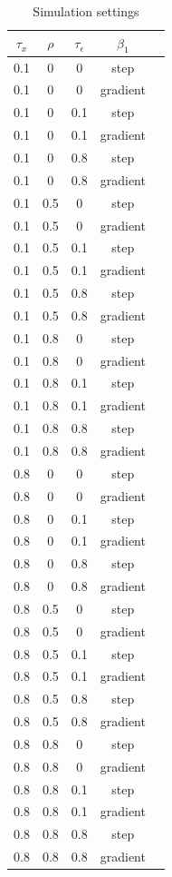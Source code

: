 \documentclass[authoryear, review, 11pt]{elsarticle}
\begin{document}
		\begin{table}[ht]
			\caption{Simulation settings} %
			\vspace{1mm}
			\centering  %
			\begin{tabular}{c c c c c} %
			\hline\hline                        %
			$\tau_x$ & $\rho$ & $\tau_\epsilon$ & $\beta_1$ \\ %
			\hline                  %
			0.1 & 0 & 0 & step \\
			0.1 & 0 & 0 & gradient \\
			0.1 & 0 & 0.1 & step \\
			0.1 & 0 & 0.1 & gradient \\
			0.1 & 0 & 0.8 & step \\
			0.1 & 0 & 0.8 & gradient \\
			0.1 & 0.5 & 0 & step \\
			0.1 & 0.5 & 0 & gradient \\
			0.1 & 0.5 & 0.1 & step \\
			0.1 & 0.5 & 0.1 & gradient \\
			0.1 & 0.5 & 0.8 & step \\
			0.1 & 0.5 & 0.8 & gradient \\
			0.1 & 0.8 & 0 & step \\
			0.1 & 0.8 & 0 & gradient \\
			0.1 & 0.8 & 0.1 & step \\
			0.1 & 0.8 & 0.1 & gradient \\
			0.1 & 0.8 & 0.8 & step \\
			0.1 & 0.8 & 0.8 & gradient \\				
			0.8 & 0 & 0 & step \\
			0.8 & 0 & 0 & gradient \\
			0.8 & 0 & 0.1 & step \\
			0.8 & 0 & 0.1 & gradient \\
			0.8 & 0 & 0.8 & step \\
			0.8 & 0 & 0.8 & gradient \\
			0.8 & 0.5 & 0 & step \\
			0.8 & 0.5 & 0 & gradient \\
			0.8 & 0.5 & 0.1 & step \\
			0.8 & 0.5 & 0.1 & gradient \\
			0.8 & 0.5 & 0.8 & step \\
			0.8 & 0.5 & 0.8 & gradient \\
			0.8 & 0.8 & 0 & step \\
			0.8 & 0.8 & 0 & gradient \\
			0.8 & 0.8 & 0.1 & step \\
			0.8 & 0.8 & 0.1 & gradient \\
			0.8 & 0.8 & 0.8 & step \\
			0.8 & 0.8 & 0.8 & gradient \\						

			\hline %
			\end{tabular}
			\label{table:simulation_settings} %
		\end{table}
	
\end{document}
